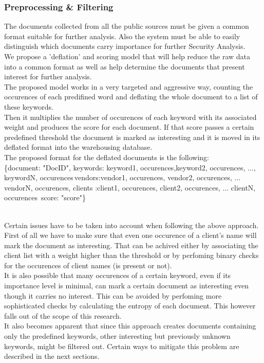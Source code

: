 \documentclass[12pt]{article}
\newcounter{subsubsubsection}[subsubsection]
\begin{document}
\subsubsection{Preprocessing \& Filtering}
The documents collected from all the public sources must be given a common format suitable for further analysis. Also the system must be able to easily distinguish which documents carry importance for further Security Analysis. 
\hfill \break\\
We propose a 'deflation' and scoring model that will help reduce the raw data into a common format as well as help determine the documents that present interest for further analysis. 
\hfill \break\\
The proposed model works in a very targeted and aggressive way, counting the occurences of each predifined word and deflating the whole document to a list of these keywords. 
\hfill \break\\
Then it multiplies the number of occurences of each keyword with its associated weight and produces the score for each document. If that score passes a certain predefined threshold the document is marked as interesting and it is moved in its deflated format into the warehousing database. 
\hfill \break\\
The proposed format for the deflated documents is the following:\\

\{document: "DocID", keywords: \lbrack \lbrack keyword1, occurences\rbrack,\lbrack keyword2, occurences\rbrack, ..., \lbrack keywordN, occurences\rbrack \rbrack\,vendors:\lbrack\lbrack vendor1, occurences\rbrack, \lbrack vendor2, occurences\rbrack, ... \lbrack vendorN, occurences\rbrack  \rbrack, clients :\lbrack\lbrack client1, occurences\rbrack, \lbrack client2, occurences\rbrack, ... \lbrack clientN, occurences\rbrack  \rbrack\, score: "score"\}

\hfill \break\\
Certain issues have to be taken into account when following the above approach. First of all we have to make sure that even one occurence of a client's name will mark the document as interesting. That can be achived either by associating the client list with a weight higher than the threshold or by perfoming binary checks for the occurences of client names (is present or not). 
\hfill \break\\
It is also possible that many occurences of a certain keyword, even if its importance level is minimal, can mark a certain document as interesting even though it carries no interest. This can be avoided by perfoming more sophisticated checks by calculating the entropy of each document. This however falls out of the scope of this research.
\hfill \break\\
It also becomes apparent that since this approach creates documents containing only the predefined keywords, other interesting but previously unknown keywords, might be filtered out. Certain ways to mitigate this problem are described in the next sections. 
\end{document}
